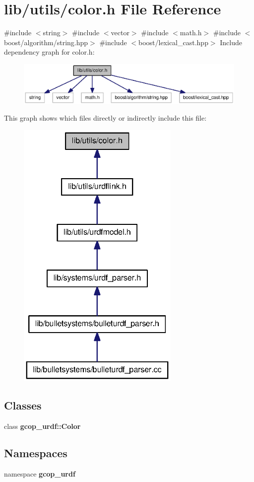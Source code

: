 \section{lib/utils/color.h \-File \-Reference}
\label{color_8h}
{\ttfamily \#include $<$string$>$}\*
{\ttfamily \#include $<$vector$>$}\*
{\ttfamily \#include $<$math.\-h$>$}\*
{\ttfamily \#include $<$boost/algorithm/string.\-hpp$>$}\*
{\ttfamily \#include $<$boost/lexical\-\_\-cast.\-hpp$>$}\*
\-Include dependency graph for color.\-h\-:
\nopagebreak
\begin{figure}[H]
\begin{center}
\leavevmode
\includegraphics[width=350pt]{color_8h__incl}
\end{center}
\end{figure}
\-This graph shows which files directly or indirectly include this file\-:
\nopagebreak
\begin{figure}[H]
\begin{center}
\leavevmode
\includegraphics[width=222pt]{color_8h__dep__incl}
\end{center}
\end{figure}
\subsection*{\-Classes}
\begin{DoxyCompactItemize}
\item 
class {\bf gcop\-\_\-urdf\-::\-Color}
\end{DoxyCompactItemize}
\subsection*{\-Namespaces}
\begin{DoxyCompactItemize}
\item 
namespace {\bf gcop\-\_\-urdf}
\end{DoxyCompactItemize}
